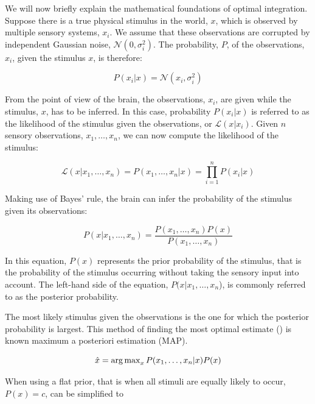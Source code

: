 We will now briefly explain the mathematical foundations of optimal integration. Suppose there is a true physical stimulus in the world, $x$, which is observed by multiple sensory systems, $x_i$. We assume that these observations are corrupted by independent Gaussian noise, $\mathcal{N}(0, \sigma_i^2)$. The probability, $P$, of the observations, $x_i$, given the stimulus $x$, is therefore:

\begin{equation}
P(x_i|x)= \mathcal{N}(x_i, \sigma_i^2)
\end{equation}

From the point of view of the brain, the observations, $x_i$, are given while the stimulus, $x$, has to be inferred. In this case, probability $P(x_i|x)$ is referred to as the likelihood of the stimulus given the observations, or $\mathcal{L}(x|x_i)$. Given $n$ sensory observations, $x_1,\dotsc,x_n$, we can now compute the likelihood of the stimulus:

\begin{equation}
\mathcal{L}(x|x_1,\dotsc,x_n) = P(x_1,\dotsc,x_n|x) = \prod_{i=1}^n P(x_i|x)
\end{equation}

Making use of Bayes' rule, the brain can infer the probability of the stimulus given its observations:

\begin{equation}
P(x|x_1,\dotsc,x_n) = \frac{P(x_1,\dotsc,x_n)P(x)}{P(x_1,\dotsc,x_n)}
\end{equation}

In this equation, $P(x)$ represents the prior probability of the stimulus, that is the probability of the stimulus occurring without taking the sensory input into account. The left-hand side of the equation, $P(x|x_1,\dotsc,x_n$), is commonly referred to as the posterior probability.

The most likely stimulus given the observations is  the one for which the posterior probability is largest. This method of finding the most optimal estimate () is known maximum a posteriori estimation (MAP).

\begin{equation}
\hat{x} = \operatorname{arg\,max}_x P(x_1,\dotsc,x_n|x)P(x)
\label{intro:eq:map}
\end{equation}

When using a flat prior, that is when all stimuli are equally likely to occur, $P(x)=c$,  can be simplified to

